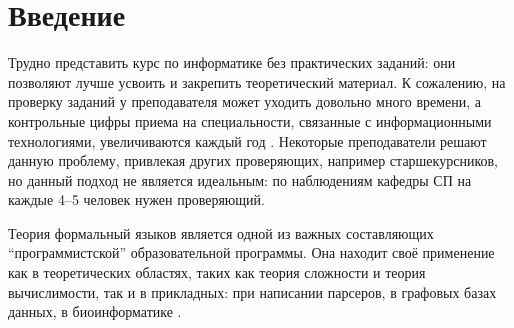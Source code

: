 
\section*{Введение}
\thispagestyle{withCompileDate}








Трудно представить курс по информатике без практических заданий: они позволяют лучше усвоить и закрепить теоретический материал.
К сожалению, на проверку заданий у преподавателя может уходить довольно много времени, а контрольные цифры приема на специальности, связанные с информационными технологиями, увеличиваются каждый год .
Некоторые преподаватели решают данную проблему, привлекая других проверяющих, например старшекурсников, но данный подход не является идеальным: по наблюдениям кафедры СП  на каждые 4--5 человек нужен проверяющий. 

Теория формальный языков является одной из важных составляющих \enquote{программистской}  образовательной программы.
Она находит своё применение как в теоретических областях, таких как теория сложности и теория вычислимости, так и в прикладных: при написании парсеров, в графовых базах данных, в биоинформатике .

